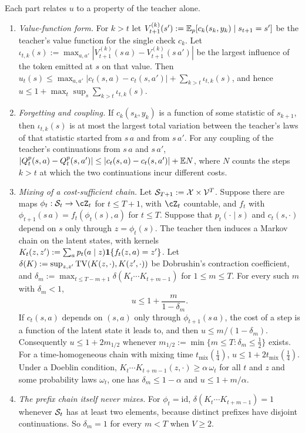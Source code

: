 \begin{theorem}\label{thm:forgetting}
\Pv\Ck Each part relates $u$ to a property of the teacher alone.
\begin{enumerate}[label=(\roman*),nosep]
\item \emph{Value-function form.} For $k>t$ let $V^{(k)}_{t+1}(s'):=\mathbb{E}_p[c_k(s_k,y_k)\mid s_{t+1}=s']$ be the teacher's value
function for the single check $c_k$. Let $\iota_{t,k}(s):=\max_{a,a'}|V^{(k)}_{t+1}(s\,a)-V^{(k)}_{t+1}(s\,a')|$ be the largest
influence of the token emitted at $s$ on that value. Then
$u_t(s)\le\max_{a,a'}|c_t(s,a)-c_t(s,a')|+\sum_{k>t}\iota_{t,k}(s)$, and hence $u\le1+\max_t\sup_s\sum_{k>t}\iota_{t,k}(s)$.
\item \emph{Forgetting and coupling.} If $c_k(s_k,y_k)$ is a function of some statistic of $s_{k+1}$, then $\iota_{t,k}(s)$ is at
most the largest total variation between the teacher's laws of that statistic started from $s\,a$ and from
$s\,a'$. For any coupling of the teacher's continuations from $s\,a$ and $s\,a'$,
$|Q^p_t(s,a)-Q^p_t(s,a')|\le|c_t(s,a)-c_t(s,a')|+\mathbb{E} N$, where $N$ counts the steps $k>t$ at which the two
continuations incur different costs.
\item \emph{Mixing of a cost-sufficient chain.} Let $\mathcal{S}_{T+1}:=\mathcal{X}\times\mathcal{V}^T$. Suppose there are maps $\phi_t:\cS_t\to\cZ_t$ for
$t\le T+1$, with $\cZ_t$ countable, and $f_t$ with $\phi_{t+1}(s\,a)=f_t(\phi_t(s),a)$ for $t\le T$. Suppose that $p_t(\cdot\mid s)$ and
$c_t(s,\cdot)$ depend on $s$ only through $z=\phi_t(s)$. The teacher then induces a Markov chain on the latent states,
with kernels $K_t(z,z'):=\sum_ap_t(a\mid z)\mathbf{1}\{f_t(z,a)=z'\}$. Let $\delta(K):=\sup_{z,z'}\mathrm{TV}(K(z,\cdot),K(z',\cdot))$ be
Dobrushin's contraction coefficient, and $\delta_m:=\max_{t\le T-m+1}\delta(K_t\cdots K_{t+m-1})$ for $1\le m\le T$. For every such $m$
with $\delta_m<1$,
\[
u\le1+\frac m{1-\delta_m}.
\]
If $c_t(s,a)$ depends on $(s,a)$ only through $\phi_{t+1}(s\,a)$, the cost of a step is a function of the latent state
it leads to, and then $u\le m/(1-\delta_m)$. Consequently $u\le1+2m_{1/2}$ whenever $m_{1/2}:=\min\{m\le T:\delta_m\le\frac12\}$
exists. For a time-homogeneous chain with mixing time $t_{\mathrm{mix}}(\frac14)$, $u\le1+2t_{\mathrm{mix}}(\frac14)$. Under a Doeblin
condition, $K_t\cdots K_{t+m-1}(z,\cdot)\ge\alpha\,\omega_t$ for all $t$ and $z$ and some probability laws $\omega_t$, one has
$\delta_m\le1-\alpha$ and $u\le1+m/\alpha$.
\item \emph{The prefix chain itself never mixes.} For $\phi_t=\mathrm{id}$, $\delta(K_t\cdots K_{t+m-1})=1$ whenever $\mathcal{S}_t$ has at least
two elements, because distinct prefixes have disjoint continuations. So $\delta_m=1$ for every $m<T$ when $V\ge2$.
\end{enumerate}
\end{theorem}
